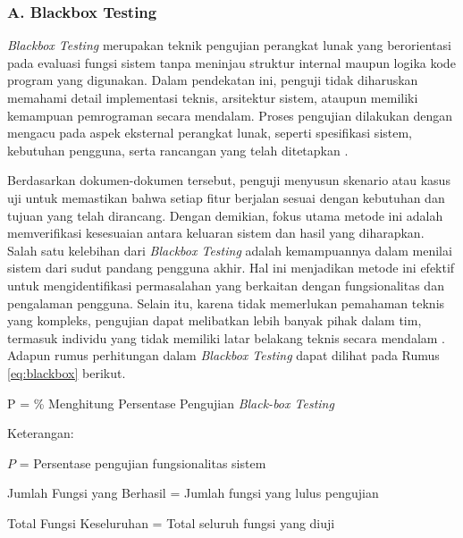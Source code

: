 \subsubsection*{A. Blackbox Testing} \label{II.BlackboxTesting}
\textit{Blackbox Testing} merupakan teknik pengujian perangkat lunak yang berorientasi pada evaluasi fungsi sistem tanpa meninjau struktur internal maupun logika kode program yang digunakan. Dalam pendekatan ini, penguji tidak diharuskan memahami detail implementasi teknis, arsitektur sistem, ataupun memiliki kemampuan pemrograman secara mendalam. Proses pengujian dilakukan dengan mengacu pada aspek eksternal perangkat lunak, seperti spesifikasi sistem, kebutuhan pengguna, serta rancangan yang telah ditetapkan \cite{abdillah2023blackbox}. \par

Berdasarkan dokumen-dokumen tersebut, penguji menyusun skenario atau kasus uji untuk memastikan bahwa setiap fitur berjalan sesuai dengan kebutuhan dan tujuan yang telah dirancang. Dengan demikian, fokus utama metode ini adalah memverifikasi kesesuaian antara keluaran sistem dan hasil yang diharapkan. Salah satu kelebihan dari \textit{Blackbox Testing} adalah kemampuannya dalam menilai sistem dari sudut pandang pengguna akhir. Hal ini menjadikan metode ini efektif untuk mengidentifikasi permasalahan yang berkaitan dengan fungsionalitas dan pengalaman pengguna. Selain itu, karena tidak memerlukan pemahaman teknis yang kompleks, pengujian dapat melibatkan lebih banyak pihak dalam tim, termasuk individu yang tidak memiliki latar belakang teknis secara mendalam \cite{cahyo2026mbg}. Adapun rumus perhitungan dalam \textit{Blackbox Testing} dapat dilihat pada Rumus \ref{eq:blackbox} berikut. \par

\begin{equationcaptioned}[eq:blackbox]
{
    P =  \%
}
{Menghitung Persentase Pengujian \textit{Black-box Testing}}
\end{equationcaptioned}

\noindent Keterangan: \par
\noindent $P$ \hspace{2.5cm} = Persentase pengujian fungsionalitas sistem \par
\noindent Jumlah Fungsi yang Berhasil \hspace{0.2cm} = Jumlah fungsi yang lulus pengujian \par
\noindent Total Fungsi Keseluruhan \hspace{0.4cm} = Total seluruh fungsi yang diuji \par

